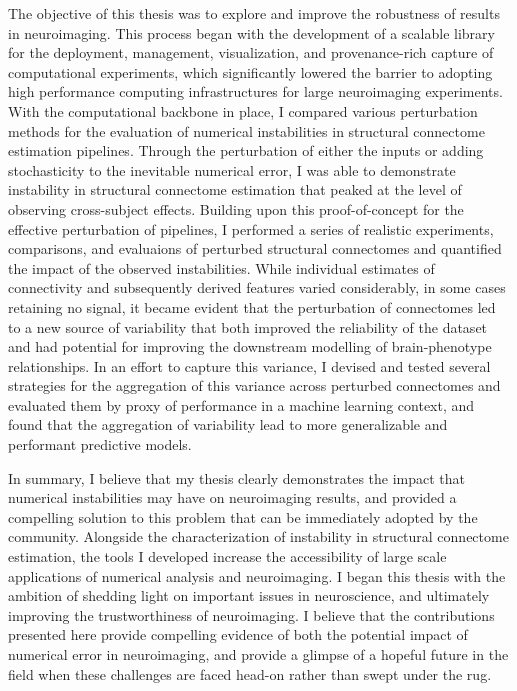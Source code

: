 The objective of this thesis was to explore and improve the robustness of results in neuroimaging. This process
began with the development of a scalable library for the deployment, management, visualization, and
provenance-rich capture of computational experiments, which significantly lowered the barrier to adopting high
performance computing infrastructures for large neuroimaging experiments. With the computational backbone in
place, I compared various perturbation methods for the evaluation of numerical instabilities in structural
connectome estimation pipelines. Through the perturbation of either the inputs or adding stochasticity to the
inevitable numerical error, I was able to demonstrate instability in structural connectome estimation that peaked
at the level of observing cross-subject effects. Building upon this proof-of-concept for the effective perturbation
of pipelines, I performed a series of realistic experiments, comparisons, and evaluaions of perturbed structural
connectomes and quantified the impact of the observed instabilities. While individual estimates of connectivity and
subsequently derived features varied considerably, in some cases retaining no signal, it became evident that the
perturbation of connectomes led to a new source of variability that both improved the reliability of the dataset and 
had potential for improving the downstream modelling of brain-phenotype relationships. In an effort to capture this
variance, I devised and tested several strategies for the aggregation of this variance across perturbed connectomes
and evaluated them by proxy of performance in a machine learning context, and found that the aggregation of
variability lead to more generalizable and performant predictive models.

In summary, I believe that my thesis clearly demonstrates the impact that numerical instabilities may have on
neuroimaging results, and provided a compelling solution to this problem that can be immediately adopted by the
community. Alongside the characterization of instability in structural connectome estimation, the tools I developed
increase the accessibility of large scale applications of numerical analysis and neuroimaging. I began this thesis
with the ambition of shedding light on important issues in neuroscience, and ultimately improving the trustworthiness
of neuroimaging. I believe that the contributions presented here provide compelling evidence of both the potential
impact of numerical error in neuroimaging, and provide a glimpse of a hopeful future in the field when these
challenges are faced head-on rather than swept under the rug.

